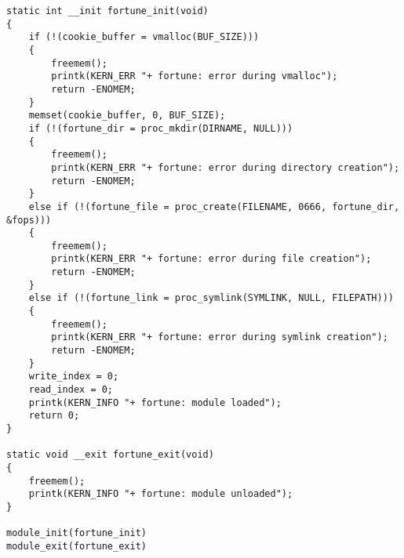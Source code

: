 \begin{lstlisting}
static int __init fortune_init(void) 
{
	if (!(cookie_buffer = vmalloc(BUF_SIZE))) 
	{
		freemem();
		printk(KERN_ERR "+ fortune: error during vmalloc");
		return -ENOMEM;
	}
	memset(cookie_buffer, 0, BUF_SIZE);
	if (!(fortune_dir = proc_mkdir(DIRNAME, NULL))) 
	{
		freemem();
		printk(KERN_ERR "+ fortune: error during directory creation");
		return -ENOMEM;
	} 
	else if (!(fortune_file = proc_create(FILENAME, 0666, fortune_dir, &fops))) 
	{
		freemem();
		printk(KERN_ERR "+ fortune: error during file creation");
		return -ENOMEM;
	} 
	else if (!(fortune_link = proc_symlink(SYMLINK, NULL, FILEPATH))) 
	{
		freemem();
		printk(KERN_ERR "+ fortune: error during symlink creation");
		return -ENOMEM;
	}
	write_index = 0;
	read_index = 0;
	printk(KERN_INFO "+ fortune: module loaded");
	return 0;
}

static void __exit fortune_exit(void) 
{
	freemem();
	printk(KERN_INFO "+ fortune: module unloaded");
}

module_init(fortune_init) 
module_exit(fortune_exit)
\end{lstlisting}






